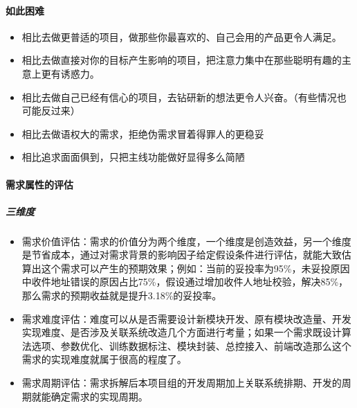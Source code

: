 \documentclass[letterpaper,11pt,english]{sphinxmanual}
\begin{document}
\paragraph{如此困难}
\label{\detokenize{chapter_skill/upgrade_manage:id9}}\begin{itemize}
\item {} 
相比去做更普适的项目，做那些你最喜欢的、自己会用的产品更令人满足。

\item {} 
相比去做直接对你的目标产生影响的项目，把注意力集中在那些聪明有趣的主意上更有诱惑力。

\item {} 
相比去做自己已经有信心的项目，去钻研新的想法更令人兴奋。（有些情况也可能反过来）

\item {} 
相比去做语权大的需求，拒绝伪需求冒着得罪人的更稳妥

\item {} 
相比追求面面俱到，只把主线功能做好显得多么简陋

\end{itemize}


\paragraph{需求属性的评估}
\label{\detokenize{chapter_skill/upgrade_manage:id10}}

\subparagraph{三维度}
\label{\detokenize{chapter_skill/upgrade_manage:id11}}\begin{itemize}
\item {} 
需求价值评估：需求的价值分为两个维度，一个维度是创造效益，另一个维度是节省成本，通过对需求背景的影响因子给定假设条件进行评估，就能大致估算出这个需求可以产生的预期效果；例如：当前的妥投率为95\%，未妥投原因中收件地址错误的原因占比75\%，假设通过增加收件人地址校验，解决85\%，那么需求的预期收益就是提升3.18\%的妥投率。

\item {} 
需求难度评估：难度可以从是否需要设计新模块开发、原有模块改造量、开发实现难度、是否涉及关联系统改造几个方面进行考量；如果一个需求既设计算法选项、参数优化、训练数据标注、模块封装、总控接入、前端改造那么这个需求的实现难度就属于很高的程度了。

\item {} 
需求周期评估：需求拆解后本项目组的开发周期加上关联系统排期、开发的周期就能确定需求的实现周期。

\end{itemize}
\end{document}
